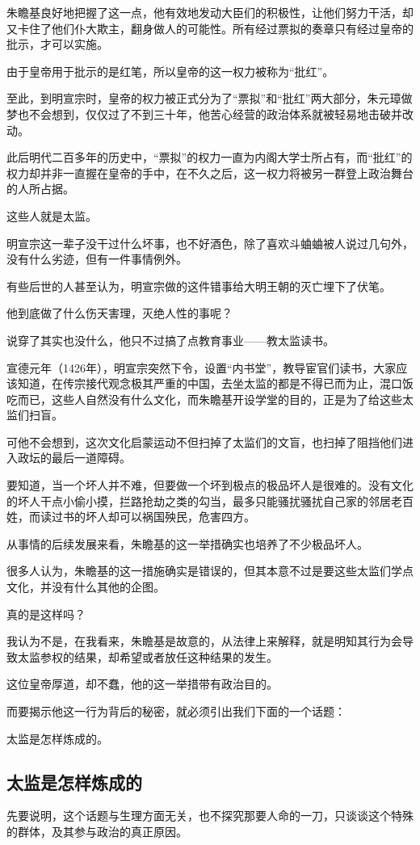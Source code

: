 \begin{multicols}{\theparacolNo}
朱瞻基良好地把握了这一点，他有效地发动大臣们的积极性，让他们努力干活，却又卡住了他们仆大欺主，翻身做人的可能性。所有经过票拟的奏章只有经过皇帝的批示，才可以实施。

由于皇帝用于批示的是红笔，所以皇帝的这一权力被称为“批红”。

至此，到明宣宗时，皇帝的权力被正式分为了“票拟”和“批红”两大部分，朱元璋做梦也不会想到，仅仅过了不到三十年，他苦心经营的政治体系就被轻易地击破并改动。

此后明代二百多年的历史中，“票拟”的权力一直为内阁大学士所占有，而“批红”的权力却并非一直握在皇帝的手中，在不久之后，这一权力将被另一群登上政治舞台的人所占据。

这些人就是太监。

明宣宗这一辈子没干过什么坏事，也不好酒色，除了喜欢斗蛐蛐被人说过几句外，没有什么劣迹，但有一件事情例外。

有些后世的人甚至认为，明宣宗做的这件错事给大明王朝的灭亡埋下了伏笔。

他到底做了什么伤天害理，灭绝人性的事呢？

说穿了其实也没什么，他只不过搞了点教育事业——教太监读书。

宣德元年（1426年），明宣宗突然下令，设置“内书堂”，教导宦官们读书，大家应该知道，在传宗接代观念极其严重的中国，去坐太监的都是不得已而为止，混口饭吃而已，这些人自然没有什么文化，而朱瞻基开设学堂的目的，正是为了给这些太监们扫盲。

可他不会想到，这次文化启蒙运动不但扫掉了太监们的文盲，也扫掉了阻挡他们进入政坛的最后一道障碍。

要知道，当一个坏人并不难，但要做一个坏到极点的极品坏人是很难的。没有文化的坏人干点小偷小摸，拦路抢劫之类的勾当，最多只能骚扰骚扰自己家的邻居老百姓，而读过书的坏人却可以祸国殃民，危害四方。

从事情的后续发展来看，朱瞻基的这一举措确实也培养了不少极品坏人。

很多人认为，朱瞻基的这一措施确实是错误的，但其本意不过是要这些太监们学点文化，并没有什么其他的企图。

真的是这样吗？

我认为不是，在我看来，朱瞻基是故意的，从法律上来解释，就是明知其行为会导致太监参权的结果，却希望或者放任这种结果的发生。

这位皇帝厚道，却不蠢，他的这一举措带有政治目的。

而要揭示他这一行为背后的秘密，就必须引出我们下面的一个话题：

太监是怎样炼成的。

\subsection{太监是怎样炼成的}
先要说明，这个话题与生理方面无关，也不探究那要人命的一刀，只谈谈这个特殊的群体，及其参与政治的真正原因。


\end{multicols}
